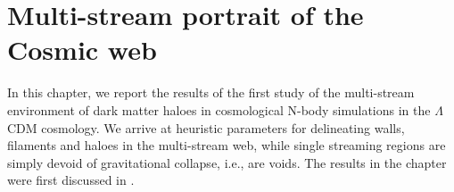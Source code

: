 \chapter{Multi-stream portrait of the Cosmic web}\label{chapter3}


In this chapter, we report the results of the first study of the multi-stream environment of dark matter haloes in cosmological N-body simulations in the $\Lambda$CDM cosmology. We arrive at heuristic parameters for delineating walls, filaments and haloes in the multi-stream web, while single streaming regions are simply devoid of gravitational collapse, i.e., are voids. The results in the chapter were first discussed in \cite{Ramachandra2015}. 


